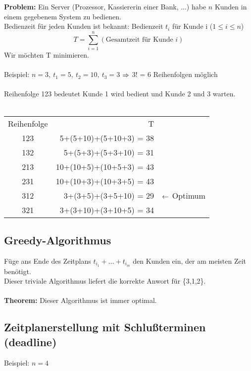\documentclass[a4paper]{scrartcl}
\begin{document}
\textbf{Problem:} Ein Server (Prozessor, Kassiererin einer Bank, ...) habe $n$ Kunden in einem gegebenem System zu bedienen. \\
Bedienzeit für jeden Kunden ist bekannt: Bedienzeit $t_i$ für Kunde i ($1 \leq i \leq n$)
$$T = \sum_{i=1}^n (\text{Gesamtzeit für Kunde } i)$$
Wir möchten T minimieren. \\
\\
Beispiel: $n=3,\ t_1=5,\ t_2=10,\ t_3=3$ $\Rightarrow$ 3! = 6 Reihenfolgen möglich \\
\\
Reihenfolge 123 bedeutet Kunde 1 wird bedient und Kunde 2 und 3 warten. \\
\\
\begin{tabular}{crl}
Reihenfolge & T \\
123 & 5+(5+10)+(5+10+3)	= 38 \\
132 & 5+(5+3)+(5+3+10) = 31 \\
213 & 10+(10+5)+(10+5+3) = 43 \\
231 & 10+(10+3)+(10+3+5) = 43 \\
312 & 3+(3+5)+(3+5+10) = 29 & $\leftarrow$ Optimum\\
321 & 3+(3+10)+(3+10+5) = 34 \\
\end{tabular}

\subsection{Greedy-Algorithmus}
Füge ans Ende des Zeitplans $t_{i_1}+\ldots+t_{i_m}$ den Kunden ein, der am meisten Zeit benötigt. \\
Dieser triviale Algorithmus liefert die korrekte Anwort für \{3,1,2\}. \\
\\
\textbf{Theorem:} Dieser Algorithmus ist immer optimal.
\subsection{Zeitplanerstellung mit Schlußterminen (deadline)}
Beispiel: $n=4$ \\
\end{document}
